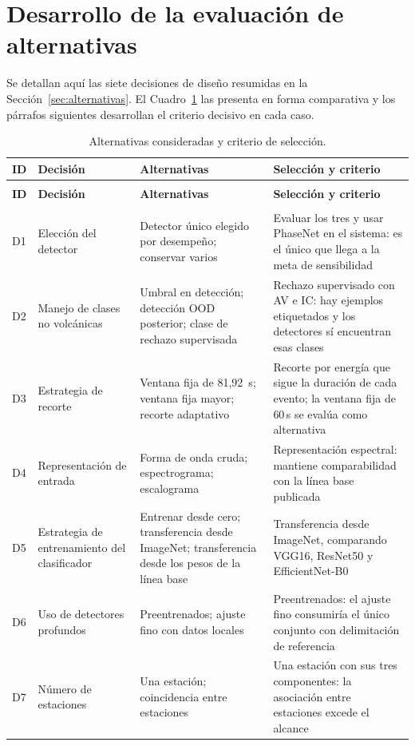 \section{Desarrollo de la evaluación de alternativas}
\label{sec:anexo-alternativas}

Se detallan aquí las siete decisiones de diseño resumidas en la
Sección~\ref{sec:alternativas}. El Cuadro~\ref{tab:alternativas} las presenta en
forma comparativa y los párrafos siguientes desarrollan el criterio decisivo en
cada caso.

{\small
\begin{longtable}{>{\raggedright\arraybackslash}p{0.8cm}>{\raggedright\arraybackslash}p{3.0cm}>{\raggedright\arraybackslash}p{3.6cm}>{\raggedright\arraybackslash}p{3.7cm}}
\caption{Alternativas consideradas y criterio de selección.}\label{tab:alternativas}\\
\toprule
\textbf{ID} & \textbf{Decisión} & \textbf{Alternativas} & \textbf{Selección y criterio} \\
\midrule
\endfirsthead
\multicolumn{4}{l}{\itshape Cuadro \thetable{} (continuación)}\\
\toprule
\textbf{ID} & \textbf{Decisión} & \textbf{Alternativas} & \textbf{Selección y criterio} \\
\midrule
\endhead
\midrule
\multicolumn{4}{r}{\itshape Continúa en la página siguiente}\\
\endfoot
\bottomrule
\endlastfoot
D1 & Elección del detector &
Detector único elegido por desempeño; conservar varios &
Evaluar los tres y usar PhaseNet en el sistema: es el único que llega a la meta
de sensibilidad \\
\addlinespace
D2 & Manejo de clases no volcánicas &
Umbral en detección; detección OOD posterior; clase de rechazo supervisada &
Rechazo supervisado con AV e IC: hay ejemplos etiquetados y los detectores sí
encuentran esas clases \\
\addlinespace
D3 & Estrategia de recorte &
Ventana fija de 81,92~s; ventana fija mayor; recorte adaptativo &
Recorte por energía que sigue la duración de cada evento; la ventana fija de
60\,s se evalúa como alternativa \\
\addlinespace
D4 & Representación de entrada &
Forma de onda cruda; espectrograma; escalograma &
Representación espectral: mantiene comparabilidad con la línea base publicada \\
\addlinespace
D5 & Estrategia de entrenamiento del clasificador &
Entrenar desde cero; transferencia desde ImageNet; transferencia desde los
pesos de la línea base &
Transferencia desde ImageNet, comparando VGG16, ResNet50 y EfficientNet-B0 \\
\addlinespace
D6 & Uso de detectores profundos &
Preentrenados; ajuste fino con datos locales &
Preentrenados: el ajuste fino consumiría el único conjunto con delimitación de
referencia \\
\addlinespace
D7 & Número de estaciones &
Una estación; coincidencia entre estaciones &
Una estación con sus tres componentes: la asociación entre estaciones excede
el alcance \\
\bottomrule
\end{longtable}
}

